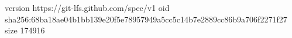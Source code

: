 version https://git-lfs.github.com/spec/v1
oid sha256:68ba18ae04b1bb139e20f5e78957949a5cc5c14b7e2889cc86b9a706f2271f27
size 174916
